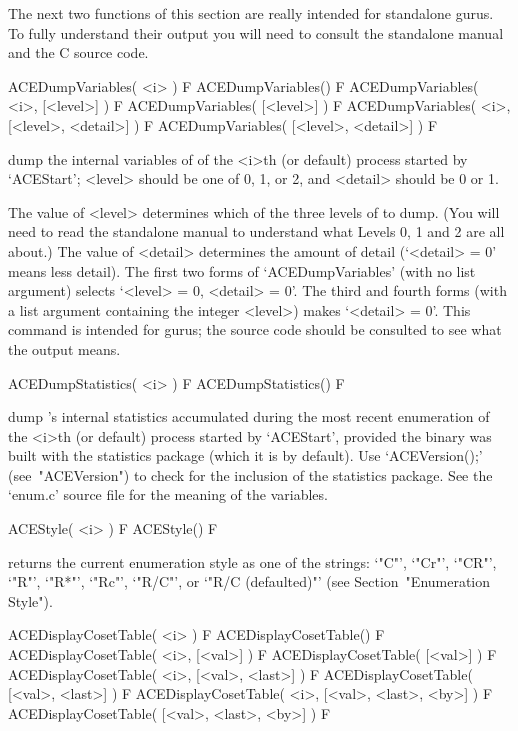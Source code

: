The next two functions of this section are really intended for  {\ACE}
standalone gurus. To fully understand their output you  will  need  to
consult the standalone manual and the C source code.

\>ACEDumpVariables( <i> ) F
\>ACEDumpVariables() F
\>ACEDumpVariables( <i>, [<level>] ) F
\>ACEDumpVariables( [<level>] ) F
\>ACEDumpVariables( <i>, [<level>, <detail>] ) F
\>ACEDumpVariables( [<level>, <detail>] ) F

dump the internal variables  of  {\ACE}  of  the  <i>th  (or  default)
process started by `ACEStart'; <level> should be one of 0,  1,  or  2,
and <detail> should be 0 or 1.

The value of <level> determines which of the three levels of {\ACE} to
dump. (You will need to read the standalone manual to understand  what
Levels 0, 1 and 2 are all about.) The value of <detail> determines the
amount of detail (`<detail> = 0' means less  detail).  The  first  two
forms of `ACEDumpVariables' (with no list argument) selects `<level> =
0, <detail> = 0'. The third and fourth forms  (with  a  list  argument
containing the integer <level>) makes `<detail> = 0'. This command  is
intended for gurus; the source code should be consulted  to  see  what
the output means.

\>ACEDumpStatistics( <i> ) F
\>ACEDumpStatistics() F

dump {\ACE}'s internal statistics accumulated during the  most  recent
enumeration of the <i>th (or default) process started  by  `ACEStart',
provided the {\ACE} binary  was  built  with  the  statistics  package
(which it is by default). Use  `ACEVersion();'  (see~"ACEVersion")  to
check for the inclusion of the statistics package.  See  the  `enum.c'
source file for the meaning of the variables.

\>ACEStyle( <i> ) F
\>ACEStyle() F

returns the current enumeration style as one of  the  strings:  `"C"',
`"Cr"', `"CR"', `"R"', `"R*"', `"Rc"', `"R/C"', or `"R/C (defaulted)"'
(see Section~"Enumeration Style").

\>ACEDisplayCosetTable( <i> ) F
\>ACEDisplayCosetTable() F
\>ACEDisplayCosetTable( <i>, [<val>] ) F
\>ACEDisplayCosetTable( [<val>] ) F
\>ACEDisplayCosetTable( <i>, [<val>, <last>] ) F
\>ACEDisplayCosetTable( [<val>, <last>] ) F
\>ACEDisplayCosetTable( <i>, [<val>, <last>, <by>] ) F
\>ACEDisplayCosetTable( [<val>, <last>, <by>] ) F

